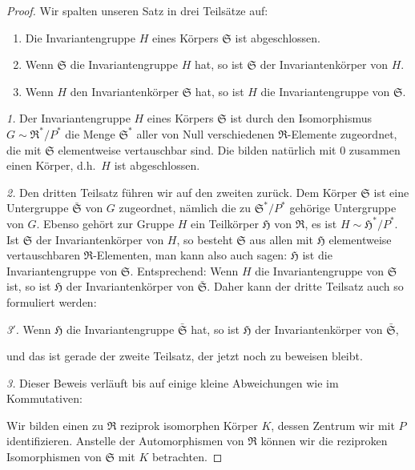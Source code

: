 \documentclass[12pt,a4paper]{article}
\theoremstyle{plain}
\theoremstyle{definition}
\theoremstyle{remark}
\begin{document}
\begin{proof}
Wir spalten unseren Satz in drei Teils\"atze auf:
\begin{enumerate}
\item Die Invariantengruppe $H$ eines K\"orpers $\mathfrak{S}$ ist abgeschlossen.
\item Wenn $\mathfrak{S}$ die Invariantengruppe $H$ hat, so ist $\mathfrak{S}$ der Invariantenk\"orper von $H$.
\item Wenn $H$ den Invariantenk\"orper $\mathfrak{S}$ hat, so ist $H$ die Invariantengruppe von $\mathfrak{S}$.
\end{enumerate}

\textit{1.} Der Invariantengruppe $H$ eines K\"orpers $\mathfrak{S}$ ist durch den Isomorphismus
$G \sim \mathfrak{R}^{*}/P^{*}$ die Menge $\mathfrak{S}^{*}$ aller von Null verschiedenen
$\mathfrak{R}$-Elemente zugeordnet, die mit $\mathfrak{S}$ elementweise vertauschbar sind. Die bilden
nat\"urlich mit $0$ zusammen einen K\"orper, d.h.\ $H$ ist abgeschlossen.

\textit{2.} Den dritten Teilsatz f\"uhren wir auf den zweiten zur\"uck. Dem K\"orper
$\mathfrak{S}$ ist eine Untergruppe $\bar{\mathfrak{S}}$ von $G$ zugeordnet, n\"amlich die zu
$\mathfrak{S}^{*}/P^{*}$ geh\"orige Untergruppe von $G$. Ebenso geh\"ort zur Gruppe $H$ ein
Teilk\"orper $\mathfrak{H}$ von $\mathfrak{R}$, es ist $H \sim \mathfrak{H}^{*}/P^{*}$. Ist $\mathfrak{S}$ der
Invariantenk\"orper von $H$, so besteht $\mathfrak{S}$ aus allen mit $\mathfrak{H}$ elementweise
vertauschbaren $\mathfrak{R}$-Elementen, man kann also auch sagen: $\mathfrak{H}$ ist die
Invariantengruppe von $\mathfrak{S}$. Entsprechend: Wenn $H$ die Invariantengruppe von
$\mathfrak{S}$ ist, so ist $\mathfrak{H}$ der Invariantenk\"orper von $\bar{\mathfrak{S}}$. Daher kann der
dritte Teilsatz auch so formuliert werden:

\textit{3$'$.} Wenn $\mathfrak{H}$ die Invariantengruppe $\bar{\mathfrak{S}}$ hat, so ist $\mathfrak{H}$ der
Invariantenk\"orper von $\bar{\mathfrak{S}}$,

und das ist gerade der zweite Teilsatz, der jetzt noch zu beweisen bleibt.

\textit{3.} Dieser Beweis verl\"auft bis auf einige kleine Abweichungen wie im Kommutativen:

Wir bilden einen zu $\mathfrak{R}$ reziprok isomorphen K\"orper $K$, dessen Zentrum wir mit
$P$ identifizieren. Anstelle der Automorphismen von $\mathfrak{R}$ k\"onnen wir die
reziproken Isomorphismen von $\mathfrak{S}$ mit $K$ betrachten.


\end{proof}
\end{document}
